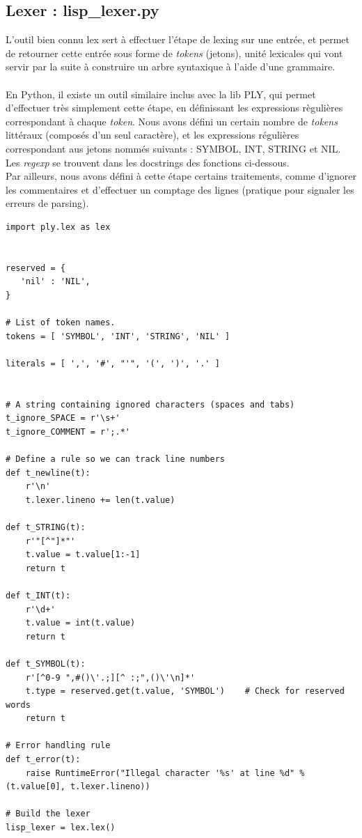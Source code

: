 \documentclass{article}
\begin{document}
\subsection{Lexer : lisp\_lexer.py}
L'outil bien connu lex sert à effectuer l'étape de lexing sur une entrée, et permet de retourner cette 
entrée sous forme de \emph{tokens} (jetons), unité lexicales qui vont servir par la suite à construire 
un arbre syntaxique à l'aide d'une grammaire.
\paragraph{}
En Python, il existe un outil similaire inclus avec la lib PLY, qui permet d'effectuer très simplement
cette étape, en définissant les expressions règulières correspondant à chaque \emph{token}.
Nous avons défini un certain nombre de \emph{tokens} littéraux (composés d'un seul caractère), et les
expressions régulières correspondant aus jetons nommés suivants : SYMBOL, INT, STRING et NIL.
Les \emph{regexp} se trouvent dans les docstrings des fonctions ci-dessous.
\\
Par ailleurs, nous avons défini à cette étape certains traitements, comme d'ignorer les commentaires
et d'effectuer un comptage des lignes (pratique pour signaler les erreurs de parsing).

\begin{verbatim}
import ply.lex as lex
 
 
reserved = {
   'nil' : 'NIL',
}
 
# List of token names.
tokens = [ 'SYMBOL', 'INT', 'STRING', 'NIL' ]
 
literals = [ ',', '#', "'", '(', ')', '.' ]
 
 
# A string containing ignored characters (spaces and tabs)
t_ignore_SPACE = r'\s+'
t_ignore_COMMENT = r';.*'
 
# Define a rule so we can track line numbers
def t_newline(t):
    r'\n'
    t.lexer.lineno += len(t.value)
 
def t_STRING(t):
    r'"[^"]*"'
    t.value = t.value[1:-1]
    return t
 
def t_INT(t):
    r'\d+'
    t.value = int(t.value)    
    return t
 
def t_SYMBOL(t):
    r'[^0-9 ",#()\'.;][^ :;",()\'\n]*'
    t.type = reserved.get(t.value, 'SYMBOL')    # Check for reserved words
    return t
 
# Error handling rule
def t_error(t):
    raise RuntimeError("Illegal character '%s' at line %d" % (t.value[0], t.lexer.lineno))
 
# Build the lexer
lisp_lexer = lex.lex()
\end{verbatim}
\end{document}
